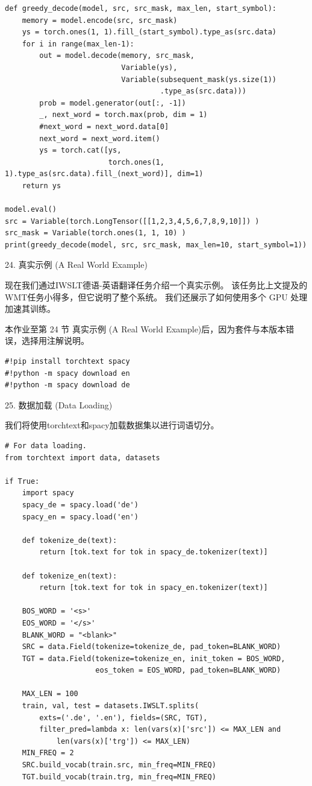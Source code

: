 \begin{Verbatim}
def greedy_decode(model, src, src_mask, max_len, start_symbol):
    memory = model.encode(src, src_mask)
    ys = torch.ones(1, 1).fill_(start_symbol).type_as(src.data)
    for i in range(max_len-1):
        out = model.decode(memory, src_mask, 
                           Variable(ys), 
                           Variable(subsequent_mask(ys.size(1))
                                    .type_as(src.data)))
        prob = model.generator(out[:, -1])
        _, next_word = torch.max(prob, dim = 1)
        #next_word = next_word.data[0]
        next_word = next_word.item()
        ys = torch.cat([ys, 
                        torch.ones(1, 1).type_as(src.data).fill_(next_word)], dim=1)
    return ys

model.eval()
src = Variable(torch.LongTensor([[1,2,3,4,5,6,7,8,9,10]]) )
src_mask = Variable(torch.ones(1, 1, 10) )
print(greedy_decode(model, src, src_mask, max_len=10, start_symbol=1))
\end{Verbatim}

24. 真实示例 (A Real World Example)

现在我们通过IWSLT德语-英语翻译任务介绍一个真实示例。 该任务比上文提及的WMT任务小得多，但它说明了整个系统。 我们还展示了如何使用多个 GPU 处理加速其训练。

本作业至第 24 节 真实示例 (A Real World Example)后，因为套件与本版本错误，选择用注解说明。

\begin{Verbatim}
#!pip install torchtext spacy
#!python -m spacy download en
#!python -m spacy download de
\end{Verbatim}

25. 数据加载 (Data Loading)

我们将使用torchtext和spacy加载数据集以进行词语切分。

\begin{Verbatim}
# For data loading.
from torchtext import data, datasets

if True:
    import spacy
    spacy_de = spacy.load('de')
    spacy_en = spacy.load('en')

    def tokenize_de(text):
        return [tok.text for tok in spacy_de.tokenizer(text)]

    def tokenize_en(text):
        return [tok.text for tok in spacy_en.tokenizer(text)]

    BOS_WORD = '<s>'
    EOS_WORD = '</s>'
    BLANK_WORD = "<blank>"
    SRC = data.Field(tokenize=tokenize_de, pad_token=BLANK_WORD)
    TGT = data.Field(tokenize=tokenize_en, init_token = BOS_WORD, 
                     eos_token = EOS_WORD, pad_token=BLANK_WORD)

    MAX_LEN = 100
    train, val, test = datasets.IWSLT.splits(
        exts=('.de', '.en'), fields=(SRC, TGT), 
        filter_pred=lambda x: len(vars(x)['src']) <= MAX_LEN and 
            len(vars(x)['trg']) <= MAX_LEN)
    MIN_FREQ = 2
    SRC.build_vocab(train.src, min_freq=MIN_FREQ)
    TGT.build_vocab(train.trg, min_freq=MIN_FREQ)
\end{Verbatim}

